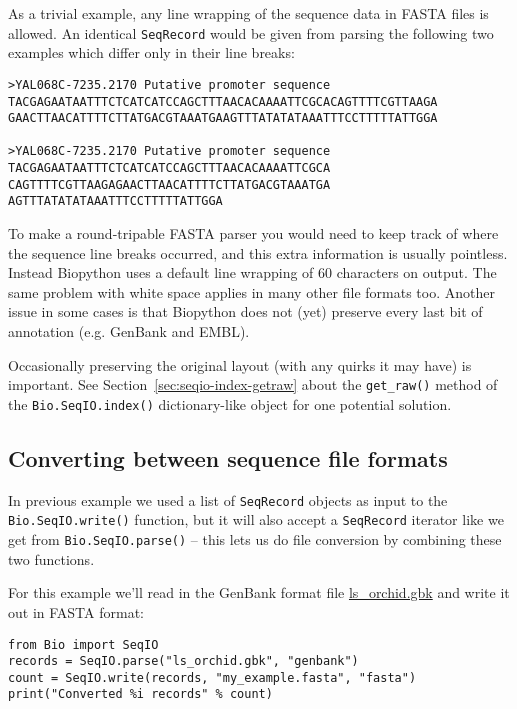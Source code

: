 As a trivial example, any line wrapping of the sequence data in FASTA files is
allowed. An identical \verb|SeqRecord| would be given from parsing the following
two examples which differ only in their line breaks:

\begin{verbatim}
>YAL068C-7235.2170 Putative promoter sequence
TACGAGAATAATTTCTCATCATCCAGCTTTAACACAAAATTCGCACAGTTTTCGTTAAGA
GAACTTAACATTTTCTTATGACGTAAATGAAGTTTATATATAAATTTCCTTTTTATTGGA

>YAL068C-7235.2170 Putative promoter sequence
TACGAGAATAATTTCTCATCATCCAGCTTTAACACAAAATTCGCA
CAGTTTTCGTTAAGAGAACTTAACATTTTCTTATGACGTAAATGA
AGTTTATATATAAATTTCCTTTTTATTGGA
\end{verbatim}

To make a round-tripable FASTA parser you would need to keep track of where the
sequence line breaks occurred, and this extra information is usually pointless.
Instead Biopython uses a default line wrapping of $60$ characters on output.
The same problem with white space applies in many other file formats too.
Another issue in some cases is that Biopython does not (yet) preserve every
last bit of annotation (e.g. GenBank and EMBL).

Occasionally preserving the original layout (with any quirks it may have) is
important. See Section~\ref{sec:seqio-index-getraw} about the \verb|get_raw()|
method of the \verb|Bio.SeqIO.index()| dictionary-like object for one potential
solution.

\subsection{Converting between sequence file formats}
\label{sec:SeqIO-conversion}

In previous example we used a list of \verb|SeqRecord| objects as input to the \verb|Bio.SeqIO.write()| function, but it will also accept a \verb|SeqRecord| iterator like we get from \verb|Bio.SeqIO.parse()| -- this lets us do file conversion by combining these two functions.

For this example we'll read in the GenBank format file \href{https://raw.githubusercontent.com/biopython/biopython/master/Doc/examples/ls_orchid.gbk}{ls\_orchid.gbk} and write it out in FASTA format:

\begin{verbatim}
from Bio import SeqIO
records = SeqIO.parse("ls_orchid.gbk", "genbank")
count = SeqIO.write(records, "my_example.fasta", "fasta")
print("Converted %i records" % count)
\end{verbatim}

